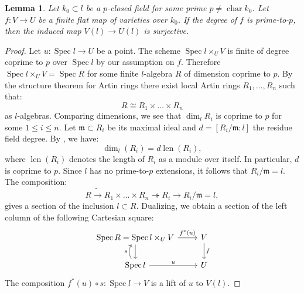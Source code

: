 \documentclass[12pt]{amsart}
\numberwithin{equation}{section}
\newtheorem{lemma}[theorem]{Lemma}
\theoremstyle{definition}
\newcommand{\Spec}{\operatorname{Spec}}
\newcommand{\Char}{\operatorname{char}}
\newcommand{\fm}{{\mathfrak{m}}}
\newcommand{\len}{\operatorname{len}}
\begin{document}
\begin{lemma}\label{lem.finite_lift}
    Let $k_0\subset l$ be a $p$-closed field for some prime $p\neq \Char k_0$. Let $f: V\to U$ be a finite flat map of varieties over $k_0$.  If the degree of $f$ is prime-to-$p$, then the induced map $V(l) \to U(l)$ is surjective.
\end{lemma}
\begin{proof}
    Let $u: \Spec l\to U$ be a point. The scheme $\Spec l \times_U V$ is finite of degree coprime to $p$ over $\Spec l$ by our assumption on $f$. Therefore $\Spec l \times_U V = \Spec R$ for some finite $l$-algebra $R$ of dimension coprime to $p$. By the structure theorem for Artin rings there exist local Artin rings $R_1,\dots,R_n$ such that:
    $$R\cong R_1\times \dots \times R_n$$
    as $l$-algebras. Comparing dimensions, we see that $\dim_l R_i$ is coprime to $p$ for some $1\leq i\leq n$. Let $\fm\subset R_i$ be its maximal ideal and $d = [R_i/\fm : l]$ the residue field degree. By \cite[Lemma A.1.3]{fulton2013intersection}, we have:
    $$\dim_l(R_i) = d \len(R_i),$$
    where $\len(R_i)$ denotes the length of $R_i$ as a module over itself. In particular, $d$ is coprime to $p$. Since $l$ has no prime-to-$p$ extensions, it follows that $R_i/\fm = l$. The composition:
    $$R \tilde{\to} R_1 \times \dots \times R_n \twoheadrightarrow R_i \to R_i/\fm = l,$$
    gives a section of the inclusion $l\subset R$. Dualizing, we obtain a section of the left column of the following Cartesian square:
    \[
\begin{tikzcd}
\Spec R = \Spec l \times_U V \arrow[r, "f^*(u)"] \arrow[d] & V \arrow[d, "f"] \\
\Spec l \arrow[u, "s", bend left] \arrow[r, "u"] & U
\end{tikzcd}
\]
    The composition $f^*(u) \circ s : \Spec l\to V$ is a lift of $u$ to $V(l)$. 
\end{proof}
\end{document}
